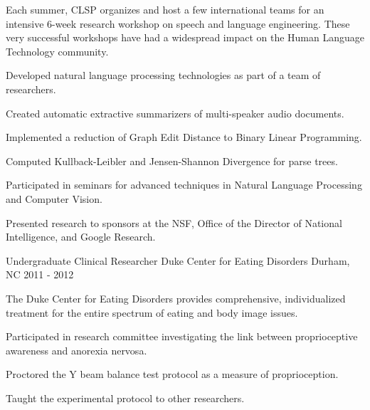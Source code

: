 \begin{cventries}
{\begin{cvparagraph}
                Each summer, CLSP organizes and host a few international teams for an intensive 6-week research workshop on speech and language engineering. These very successful workshops have had a widespread impact on the Human Language Technology community.
            \end{cvparagraph}
            \begin{cvitems}
                \item{Developed natural language processing technologies as part of a team of researchers.}
                \item{Created automatic extractive summarizers of multi-speaker audio documents.}
                \item{Implemented a reduction of Graph Edit Distance to Binary Linear Programming.}
                \item{Computed Kullback-Leibler and Jensen-Shannon Divergence for parse trees.}
                \item{Participated in seminars for advanced techniques in Natural Language Processing and Computer Vision.}
                \item{Presented research to sponsors at the NSF, Office of the Director of National Intelligence, and Google Research.}
            \end{cvitems}
        }
    \cventry
                {Undergraduate Clinical Researcher}
                {Duke Center for Eating Disorders}
                {Durham, NC}
                {2011 - 2012}
        {
            \begin{cvparagraph}
                The Duke Center for Eating Disorders provides comprehensive, individualized treatment for the entire spectrum of eating and body image issues.
            \end{cvparagraph}
            \begin{cvitems}
                \item{Participated in research committee investigating the link between proprioceptive awareness and anorexia nervosa.}
                \item{Proctored the Y beam balance test protocol as a measure of proprioception.}
                \item{Taught the experimental protocol to other researchers.}            
            \end{cvitems}
        }
\end{cventries}
